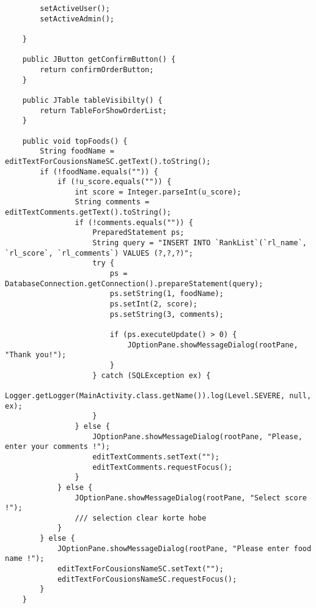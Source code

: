 \documentclass[12pt,a4paper]{article}
\begin{document}
\begin{lstlisting}
        setActiveUser();
        setActiveAdmin();

    }

    public JButton getConfirmButton() {
        return confirmOrderButton;
    }

    public JTable tableVisibilty() {
        return TableForShowOrderList;
    }

    public void topFoods() {
        String foodName = editTextForCousionsNameSC.getText().toString();
        if (!foodName.equals("")) {
            if (!u_score.equals("")) {
                int score = Integer.parseInt(u_score);
                String comments = editTextComments.getText().toString();
                if (!comments.equals("")) {
                    PreparedStatement ps;
                    String query = "INSERT INTO `RankList`(`rl_name`, `rl_score`, `rl_comments`) VALUES (?,?,?)";
                    try {
                        ps = DatabaseConnection.getConnection().prepareStatement(query);
                        ps.setString(1, foodName);
                        ps.setInt(2, score);
                        ps.setString(3, comments);

                        if (ps.executeUpdate() > 0) {
                            JOptionPane.showMessageDialog(rootPane, "Thank you!");
                        }
                    } catch (SQLException ex) {
                        Logger.getLogger(MainActivity.class.getName()).log(Level.SEVERE, null, ex);
                    }
                } else {
                    JOptionPane.showMessageDialog(rootPane, "Please, enter your comments !");
                    editTextComments.setText("");
                    editTextComments.requestFocus();
                }
            } else {
                JOptionPane.showMessageDialog(rootPane, "Select score !");
                /// selection clear korte hobe
            }
        } else {
            JOptionPane.showMessageDialog(rootPane, "Please enter food name !");
            editTextForCousionsNameSC.setText("");
            editTextForCousionsNameSC.requestFocus();
        }
    }


\end{lstlisting}
\end{document}
